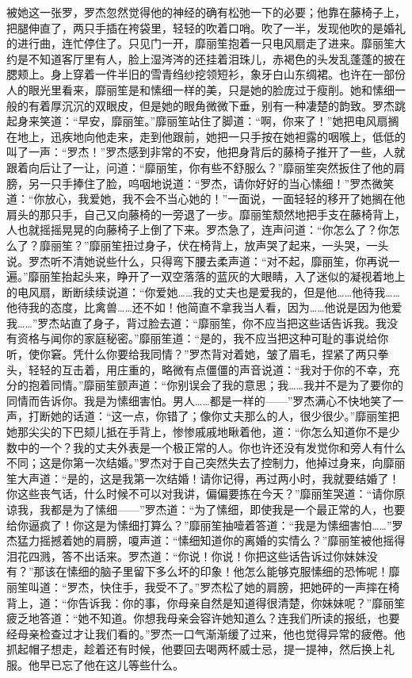 \par 被她这一张罗，罗杰忽然觉得他的神经的确有松弛一下的必要；他靠在藤椅子上，把腿伸直了，两只手插在袴袋里，轻轻的吹着口哨。吹了一半，发现他吹的是婚礼的进行曲，连忙停住了。只见门一开，靡丽笙抱着一只电风扇走了进来。靡丽笙大约是不知道客厅里有人，脸上湿涔涔的还挂着泪珠儿，赤褐色的头发乱蓬蓬的披在腮颊上。身上穿着一件半旧的雪青绉纱挖领短衫，象牙白山东绸裙。也许在一部份人的眼光里看来，靡丽笙是和愫细一样的美，只是她的脸庞过于瘦削。她和愫细一般的有着厚沉沉的双眼皮，但是她的眼角微微下垂，别有一种凄楚的韵致。罗杰跳起身来笑道：“早安，靡丽笙。”靡丽笙站住了脚道：“啊，你来了！”她把电风扇搁在地上，迅疾地向他走来，走到他跟前，她把一只手按在她袒露的咽喉上，低低的叫了一声：“罗杰！”罗杰感到非常的不安，他把身背后的藤椅子推开了一些，人就跟着向后让了一让，问道：“靡丽笙，你有些不舒服么？”靡丽笙突然扳住了他的肩膀，另一只手捧住了脸，呜咽地说道：“罗杰，请你好好的当心愫细！”罗杰微笑道：“你放心，我爱她，我不会不当心她的！”一面说，一面轻轻的移开了她搁在他肩头的那只手，自己又向藤椅的一旁退了一步。靡丽笙颓然地把手支在藤椅背上，人也就摇摇晃晃的向藤椅子上倒了下来。罗杰急了，连声问道：“你怎么了？你怎么了？靡丽笙？”靡丽笙扭过身子，伏在椅背上，放声哭了起来，一头哭，一头说。罗杰听不清她说些什么，只得弯下腰去柔声道：“对不起，靡丽笙，你再说一遍。”靡丽笙抬起头来，睁开了一双空落落的蓝灰的大眼睛，入了迷似的凝视着地上的电风扇，断断续续说道：“你爱她……我的丈夫也是爱我的，但是他……他待我……他待我的态度，比禽兽……还不如！他简直不拿我当人看，因为……他说是因为他爱我……”罗杰站直了身子，背过脸去道：“靡丽笙，你不应当把这些话告诉我。我没有资格与闻你的家庭秘密。”靡丽笙道：“是的，我不应当把这种可耻的事说给你听，使你窘。凭什么你要给我同情？”罗杰背对着她，皱了眉毛，捏紧了两只拳头，轻轻的互击着，用庄重的，略微有点僵僵的声音说道：“我对于你的不幸，充分的抱着同情。”靡丽笙颤声道：“你别误会了我的意思；我……我并不是为了要你的同情而告诉你。我是为愫细害怕。男人……都是一样的——”罗杰满心不快地笑了一声，打断她的话道：“这一点，你错了；像你丈夫那么的人，很少很少。”靡丽笙把她那尖尖的下巴颏儿抵在手背上，惨惨戚戚地瞅着他，道：“你怎么知道你不是少数中的一个？我的丈夫外表是一个极正常的人。你也许还没有发觉你和旁人有什么不同；这是你第一次结婚。”罗杰对于自己突然失去了控制力，他掉过身来，向靡丽笙大声道：“是的，这是我第一次结婚！请你记得，再过两小时，我就要结婚了！你这些丧气话，什么时候不可以对我讲，偏偏要拣在今天？”靡丽笙哭道：“请你原谅我，我都是为了愫细——”罗杰道：“为了愫细，即使我是一个最正常的人，也要给你逼疯了！你这是为愫细打算么？”靡丽笙抽噎着答道：“我是为愫细害怕……”罗杰猛力摇撼着她的肩膀，嗄声道：“愫细知道你的离婚的实情么？”靡丽笙被他摇得泪花四溅，答不出话来。罗杰道：“你说！你说！你把这些话告诉过你妹妹没有？”那该在愫细的脑子里留下多么坏的印象！他怎么能够克服愫细的恐怖呢！靡丽笙叫道：“罗杰，快住手，我受不了。”罗杰松了她的肩膀，把她砰的一声摔在椅背上，道：“你告诉我：你的事，你母亲自然是知道得很清楚，你妹妹呢？”靡丽笙疲乏地答道：“她不知道。你想我母亲会容许她知道么？连我们所读的报纸，也要经母亲检查过才让我们看的。”罗杰一口气渐渐缓了过来，他也觉得异常的疲倦。他抓起帽子想走，趁着还有时候，他要回去喝两杯威士忌，提一提神，然后换上礼服。他早已忘了他在这儿等些什么。
